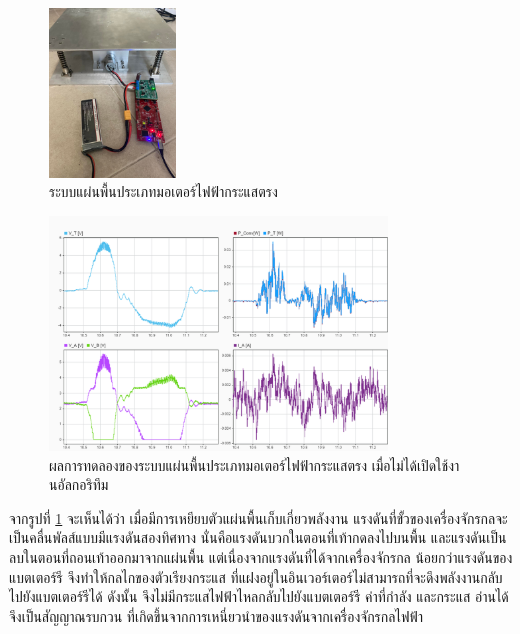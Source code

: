 \documentclass[11pt,a4paper]{article}
\begin{document}
\begin{figure}[H]
    \centering
    \includegraphics[width=0.3\textwidth]{dc-results/dc-exp.jpg}
    \caption{ระบบแผ่นพื้นประเภทมอเตอร์ไฟฟ้ากระแสตรง}
\end{figure}


\begin{figure}[H]
    \centering
    \includegraphics[width=0.8\textwidth]{dc-results/dc-no-inv.png}
    \caption{ผลการทดลองของระบบแผ่นพื้นประเภทมอเตอร์ไฟฟ้ากระแสตรง เมื่อไม่ได้เปิดใช้งานอัลกอริทึม}
    \label{dc-no-inv}
\end{figure}

จากรูปที่ \ref{dc-no-inv} จะเห็นได้ว่า เมื่อมีการเหยียบตัวแผ่นพื้นเก็บเกี่ยวพลังงาน แรงดันที่ขั้วของเครื่องจักรกลจะเป็นคลื่นพัลส์แบบมีแรงดันสองทิศทาง นั่นคือแรงดันบวกในตอนที่เท้ากดลงไปบนพื้น และแรงดันเป็นลบในตอนที่ถอนเท้าออกมาจากแผ่นพื้น แต่เนื่องจากแรงดันที่ได้จากเครื่องจักรกล น้อยกว่าแรงดันของแบตเตอร์รี จึงทำให้กลไกของตัวเรียงกระแส ที่แฝงอยู่ในอินเวอร์เตอร์ไม่สามารถที่จะดึงพลังงานกลับไปยังแบตเตอร์รีได้ ดังนั้น จึงไม่มีกระแสไฟฟ้าไหลกลับไปยังแบตเตอร์รี ค่าที่กำลัง และกระแส อ่านได้ จึงเป็นสัญญาณรบกวน ที่เกิดขึ้นจากการเหนี่ยวนำของแรงดันจากเครื่องจักรกลไฟฟ้า
\end{document}
